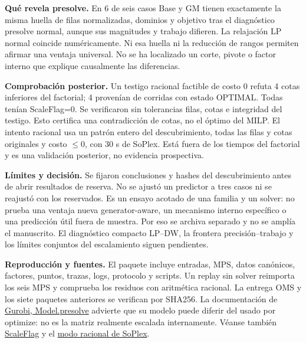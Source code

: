 \documentclass[11pt,a4paper]{article}
\begin{document}
\textbf{Qué revela presolve.} En 6 de seis casos Base y GM tienen
exactamente la misma huella de filas normalizadas, dominios y objetivo tras
el diagnóstico presolve normal, aunque sus magnitudes y trabajo difieren.
La relajación LP normal coincide numéricamente. Ni esa huella ni la reducción
de rangos permiten afirmar una ventaja universal. No se ha localizado un corte,
pivote o factor interno que explique causalmente las diferencias.

\textbf{Comprobación posterior.} Un testigo racional factible de costo 0 refuta 4 cotas inferiores del factorial; 4 provenían de corridas con estado OPTIMAL. Todas tenían ScaleFlag=0. Se verificaron sin tolerancias filas, cotas e integridad del testigo. Esto certifica una contradicción de cotas, no el óptimo del MILP.
El intento racional usa un patrón entero del descubrimiento, todas las filas y
cotas originales y costo $\leq0$, con 30 s de SoPlex. Está fuera de los tiempos
del factorial y es una validación posterior, no evidencia prospectiva.

\textbf{Límites y decisión.} Se fijaron conclusiones y hashes del descubrimiento
antes de abrir resultados de reserva. No se ajustó un predictor a tres casos
ni se reajustó con los reservados. Es un ensayo acotado de una familia y un
solver: no prueba una ventaja nueva generator-aware, un mecanismo interno
específico o una predicción útil fuera de muestra. Por eso se archiva separado
y no se amplía el manuscrito. El diagnóstico compacto LP--DW, la frontera
precisión--trabajo y los límites conjuntos del escalamiento siguen pendientes.

\textbf{Reproducción y fuentes.} El paquete incluye entradas, MPS, datos
canónicos, factores, puntos, trazas, logs, protocolo y scripts. Un replay sin
solver reimporta los seis MPS y comprueba los residuos con aritmética racional.
La entrega OMS y los siete paquetes anteriores se verifican por SHA256.
La documentación de \href{https://docs.gurobi.com/projects/optimizer/en/current/reference/python/model.html#Model.presolve}{Gurobi, Model.presolve}
advierte que su modelo puede diferir del usado por optimize: no es la matriz
realmente escalada internamente. Véanse también
\href{https://docs.gurobi.com/projects/optimizer/en/current/reference/parameters.html#parameter:ScaleFlag}{ScaleFlag}
y el \href{https://soplex.zib.de/doc/html/EXACT.php}{modo racional de SoPlex}.
\end{document}
